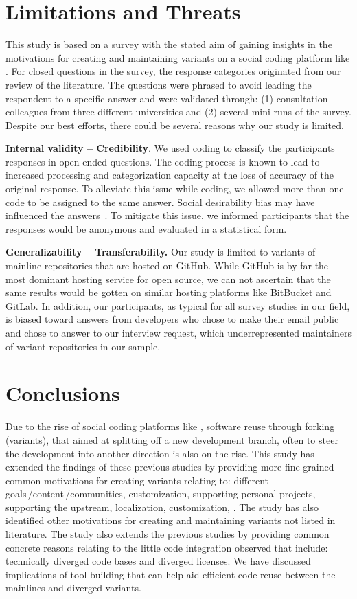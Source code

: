 \section{Limitations and Threats}
This study is based on a survey with the stated aim of gaining insights
in the motivations for creating and maintaining variants on a social coding platform like \gh.
For closed questions in the survey, the response categories originated from our review of the literature.
The questions were phrased to avoid leading the respondent to a specific answer and were validated through: (1) consultation colleagues from three different universities and (2) several mini-runs of the survey. Despite our best efforts, there could be several reasons why our study is limited.

\noindent \textbf{Internal validity -- Credibility}. We used coding to classify the participants responses in open-ended questions. The coding process is known to lead to increased processing and categorization capacity at the loss of accuracy of the original response. To alleviate this issue while coding, we allowed more than one code to be assigned to the same answer. 
Social desirability bias may have influenced the answers~\cite{Furnham:1986}. To mitigate this issue, we informed participants that the responses would be anonymous and evaluated in a statistical form.

\noindent \textbf{Generalizability – Transferability.} Our study is limited to variants of mainline repositories that are hosted on GitHub. While GitHub is by far the most dominant hosting service for open source, we can not ascertain that the same results would be gotten on similar hosting platforms like BitBucket and GitLab.
In addition, our participants, as typical for all survey studies in our field, is biased toward answers from developers who chose to make their email public and chose to answer to our interview request, which underrepresented maintainers of variant repositories in our sample.

\section{Conclusions}
Due to the rise of social coding platforms like \gh, software reuse through forking (variants), that aimed at splitting off a new development branch, often to steer the development into another direction is also on the rise. 
This study has extended the findings of these previous studies by providing more fine-grained common motivations for creating variants relating to: different goals\,/content\,/communities, customization, supporting personal projects, supporting the upstream, localization, customization,
. The study has also identified other motivations for creating and maintaining variants not listed in literature.
The study also extends the previous studies by providing common concrete reasons relating to the little code integration observed that include: technically diverged code bases and diverged licenses.
We have discussed implications of tool building that can help aid efficient code reuse between the mainlines and diverged variants.